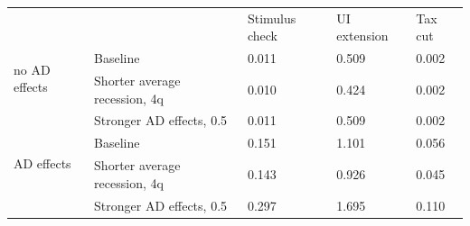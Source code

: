 \documentclass{econsocart}
\begin{document}
\begin{center}
  \begin{tabular}
    {@{}lllll@{}}
    \toprule
                                   &                               & Stimulus check & UI extension & Tax cut \\ \cmidrule(l){1-5}
    \multirow{2}{*}{no AD effects} & Baseline                      & 0.011          & 0.509        & 0.002   \\
                                   & Shorter average recession, 4q & 0.010          & 0.424        & 0.002   \\
                                   & Stronger AD effects, 0.5      & 0.011          & 0.509        & 0.002   \\ \cmidrule(l){1-5}
    \multirow{2}{*}{AD effects}    & Baseline                      & 0.151          & 1.101        & 0.056   \\
                                   & Shorter average recession, 4q & 0.143          & 0.926        & 0.045   \\
                                   & Stronger AD effects, 0.5      & 0.297          & 1.695        & 0.110   \\ \cmidrule(l){1-5}
  \end{tabular}
  \label{tab:robustness_recession_property_results}
\end{center}
\end{document}
